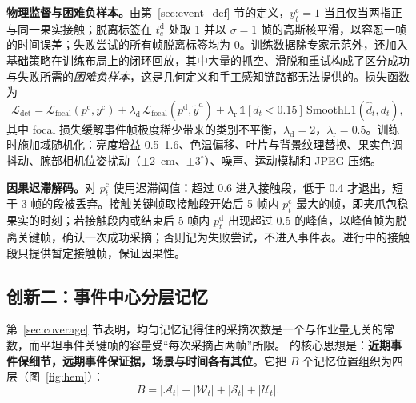 \textbf{物理监督与困难负样本。}由第~\ref{sec:event_def} 节的定义，$y^{\mathrm c}_t=1$ 当且仅当两指正与同一果实接触；脱离标签在 $t^{\mathrm d}_e$ 处取 1 并以 $\sigma=1$ 帧的高斯核平滑，以容忍一帧的时间误差；失败尝试的所有帧脱离标签均为 0。训练数据除专家示范外，还加入基础策略在训练布局上的闭环回放，其中大量的抓空、滑脱和重试构成了区分成功与失败所需的\emph{困难负样本}，这是几何定义和手工感知链路都无法提供的。损失函数为
\begin{equation}
\mathcal L_{\mathrm{det}}=\mathcal L_{\mathrm{focal}}(p^{\mathrm c},y^{\mathrm c})+\lambda_{\mathrm d}\,\mathcal L_{\mathrm{focal}}(p^{\mathrm d},\tilde y^{\mathrm d})+\lambda_{\mathrm r}\,\mathbb 1[d_t<0.15]\,\mathrm{SmoothL1}(\hat d_t,d_t),
\end{equation}
其中 focal 损失\cite{lin2017focal}缓解事件帧极度稀少带来的类别不平衡，$\lambda_{\mathrm d}=2$，$\lambda_{\mathrm r}=0.5$。训练时施加域随机化\cite{tobin2017domain}：亮度增益 0.5--1.6、色温偏移、叶片与背景纹理替换、果实色调抖动、腕部相机位姿扰动（$\pm2$~cm、$\pm3^\circ$）、噪声、运动模糊和 JPEG 压缩。

\textbf{因果迟滞解码。}对 $p^{\mathrm c}_t$ 使用迟滞阈值：超过 0.6 进入接触段，低于 0.4 才退出，短于 3 帧的段被丢弃。接触关键帧取接触段开始后 5 帧内 $p^{\mathrm c}_t$ 最大的帧，即夹爪包稳果实的时刻；若接触段内或结束后 5 帧内 $p^{\mathrm d}_t$ 出现超过 0.5 的峰值，以峰值帧为脱离关键帧，确认一次成功采摘；否则记为失败尝试，不进入事件表。进行中的接触段只提供暂定接触帧，保证因果性。

\subsection{创新二：事件中心分层记忆 \hem}
\label{sec:hem}
第~\ref{sec:coverage} 节表明，均匀记忆记得住的采摘次数是一个与作业量无关的常数，而平坦事件关键帧的容量受“每次采摘占两帧”所限。\hem{} 的核心思想是：\textbf{近期事件保细节，远期事件保证据，场景与时间各有其位}。它把 $B$ 个记忆位置组织为四层（图~\ref{fig:hem}）：
\begin{equation}
B=|\mathcal A_t|+|\mathcal W_t|+|\mathcal S_t|+|\mathcal U_t|.
\end{equation}

